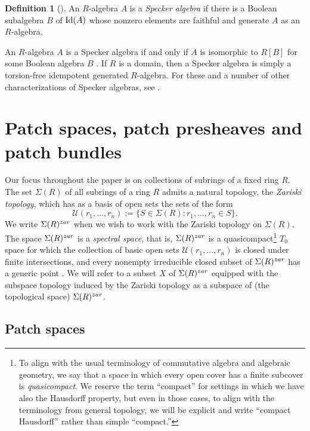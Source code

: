 \documentclass[11pt]{amsart}
\theoremstyle{definition}
\newtheorem{definition}[theorem]{Definition}
\def\Id{\mbox{\rm Id}}
\begin{document}
\begin{definition}[{\cite[Definition 2.3]{BMMO}}] An $R$-algebra $A$ is a {\it Specker algebra} if there is a Boolean subalgebra $B$ of $\Id(A)$ whose nonzero elements are faithful and generate $A$ as an $R$-algebra.
\end{definition} 

An $R$-algebra $A$ is a Specker algebra if and only if $A$ is isomorphic to $R[B]$ for some Boolean algebra $B$ \cite[Theorem 2.7]{BMMO}. 
If $R$ is a domain, then a Specker algebra is simply a torsion-free idempotent generated $R$-algebra. For these and a number of other characterizations of Specker algebras, see \cite[Section 2]{BMMO}. 

 \section{Patch spaces, patch presheaves and patch bundles}\label{sec: 3 patch spaces, presheaves, bundles}


 
Our focus throughout the paper is on collections of subrings of a fixed ring $R$. 
The set $\Sigma(R)$ of all subrings of a ring $R$ admits a natural topology, the {\it Zariski topology}, which has as a basis of open sets the sets of the form $${\mathcal{U}}(r_1,\ldots,r_n) := \{S \in \Sigma(R):r_1,\ldots,r_n \in S\}.$$
We write $\Sigma(R)^{\rm zar}$ when we wish to work with the Zariski topology on  $\Sigma(R)$. The space $\Sigma(R)^{\rm zar}$
is a {\it spectral space}, that is, $\Sigma(R)^{\rm zar}$ is a quasicompact\footnote{To align with the usual terminology  of commutative algebra and algebraic geometry, we say  that a space  in which every open cover has a finite subcover is {\it quasicompact}.  We reserve the term ``compact'' for settings in which we have also the Hausdorff property, but even in those cases, to align with the terminology from general topology, we will be explicit and write ``compact Hausdorff'' rather than simple ``compact.''} $T_0$ space for which the collection of basic open sets  ${\mathcal{U}}(r_1,\ldots,r_n)$ is closed under finite intersections, and every nonempty irreducible closed subset of $\Sigma(R)^{\rm zar}$ has a  generic point \cite[II.3.4]{Joh86}. We will refer to a subset $X$ of $\Sigma(R)^{\rm zar}$ equipped with the subspace topology induced by the Zariski topology as a subspace of (the topological space) $\Sigma(R)^{\rm zar}$.


\subsection{Patch spaces}\label{subsection: patch spaces}
\end{document}
